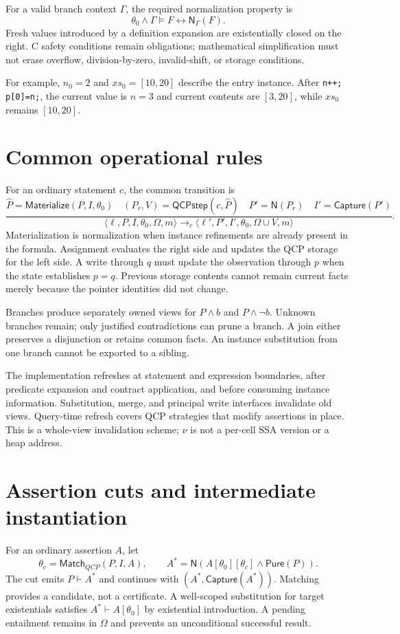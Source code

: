 \documentclass[10pt]{article}
\newcommand{\Norm}{\mathsf{N}}
\newcommand{\Capture}{\mathsf{Capture}}
\begin{document}
For a valid branch context $\Gamma$, the required normalization property is
\[
 \theta_0\land\Gamma\models F\leftrightarrow\Norm_\Gamma(F).
\]
Fresh values introduced by a definition expansion are existentially closed on
the right. C safety conditions remain obligations; mathematical simplification
must not erase overflow, division-by-zero, invalid-shift, or storage conditions.

For example, $n_0=2$ and $xs_0=[10,20]$ describe the entry instance. After
\texttt{n++; p[0]=n;}, the current value is $n=3$ and current contents are
$[3,20]$, while $xs_0$ remains $[10,20]$.

\section{Common operational rules}
For an ordinary statement $c$, the common transition is
\[
\frac{
 \widehat P=\mathsf{Materialize}(P,I,\theta_0)\quad
 (P_r,V)=\mathsf{QCPstep}(c,\widehat P)\quad
 P'=\Norm(P_r)\quad I'=\Capture(P')
}{
 \langle\ell,P,I,\theta_0,\Omega,m\rangle
 \longrightarrow_c
 \langle\ell',P',I',\theta_0,\Omega\cup V,m\rangle
}.
\]
Materialization is normalization when instance refinements are already present
in the formula. Assignment evaluates the right side and updates the QCP
storage for the left side. A write through $q$ must update the observation
through $p$ when the state establishes $p=q$. Previous storage contents cannot
remain current facts merely because the pointer identities did not change.

Branches produce separately owned views for $P\land b$ and $P\land\neg b$.
Unknown branches remain; only justified contradictions can prune a branch.
A join either preserves a disjunction or retains common facts. An instance
substitution from one branch cannot be exported to a sibling.

The implementation refreshes at statement and expression boundaries, after
predicate expansion and contract application, and before consuming instance
information. Substitution, merge, and principal write interfaces invalidate
old views. Query-time refresh covers QCP strategies that modify assertions
in place. This is a whole-view invalidation scheme; $\nu$ is not a per-cell
SSA version or a heap address.

\section{Assertion cuts and intermediate instantiation}
For an ordinary assertion $A$, let
\[
 \theta_c=\mathsf{Match}_{QCP}(P,I,A),\qquad
 A^*=\Norm(A[\theta_0][\theta_c]\land\mathsf{Pure}(P)).
\]
The cut emits $P\vdash A^*$ and continues with $(A^*,\Capture(A^*))$. Matching
provides a candidate, not a certificate. A well-scoped substitution for target
existentials satisfies $A^*\vdash A[\theta_0]$ by existential introduction. A pending entailment remains in
$\Omega$ and prevents an unconditional successful result.
\end{document}
